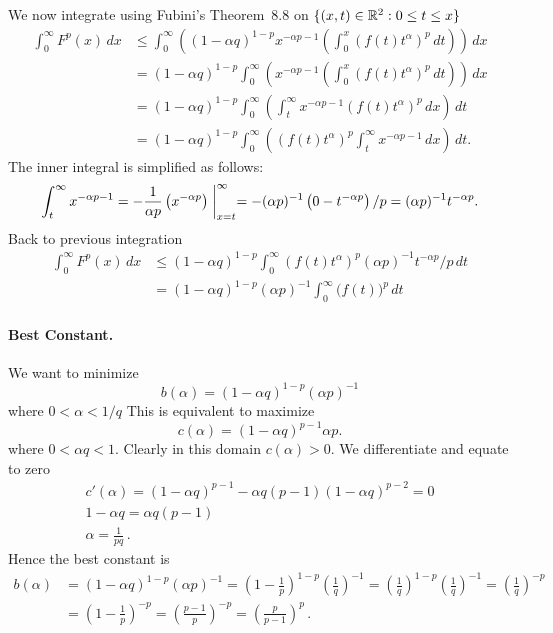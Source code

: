 \begin{enumerate}
We now integrate using 
Fubini's Theorem~8.8 on \(\{(x,t)\in\mathbb{R}^2: 0\leq t \leq x\}\)
\begin{align*}
\int_0^\infty F^p(x)\,dx 
&\leq \int_0^\infty
  \left((1-\alpha q)^{1-p} x^{-\alpha p - 1}
   \left(\int_0^x \left(f(t)t^\alpha\right)^p\,dt\right)\right)\,dx
   \\
&= (1-\alpha q)^{1-p}
   \int_0^\infty
   \left( x^{-\alpha p - 1}
   \left(\int_0^x \left(f(t)t^\alpha\right)^p\,dt\right)\right)\,dx
   \\
&= (1-\alpha q)^{1-p}
   \int_0^\infty 
     \left(\int_t^\infty x^{-\alpha p - 1}
                 \left(f(t)t^\alpha\right)^p\,dx\right)\,dt
   \\
&= (1-\alpha q)^{1-p}
   \int_0^\infty 
     \left(\left(f(t)t^\alpha\right)^p
       \int_t^\infty x^{-\alpha p - 1}
                 \,dx\right)\,dt.
\end{align*}
The inner integral is simplified as follows:
\begin{equation*}
\int_t^\infty x^{-\alpha p - 1}
= -\frac{1}{\alpha p}\left(x^{-\alpha p}\right)\biggm|_{x=t}^\infty
= -(\alpha p)^{-1}\left(0 - t^{-\alpha p}\right)/p = (\alpha p)^{-1} t^{-\alpha p}.
\end{equation*}
Back to previous integration
\begin{align*}
\int_0^\infty F^p(x)\,dx 
 &\leq (1-\alpha q)^{1-p}
   \int_0^\infty \left(f(t)t^\alpha\right)^p (\alpha p)^{-1} t^{-\alpha p}/p\,dt
 \\
 &= (1-\alpha q)^{1-p} (\alpha p)^{-1} \int_0^\infty \bigl(f(t)\bigr)^p\,dt
\end{align*}

\paragraph{Best Constant.}
We want to minimize
\begin{equation*}
b(\alpha) = (1-\alpha q)^{1-p} (\alpha p)^{-1}
\end{equation*}
where \(0 < \alpha < 1/q\)
This is equivalent to maximize  
\begin{equation*}
c(\alpha) = (1-\alpha q)^{p-1} \alpha p.
\end{equation*}
where \(0 < \alpha q < 1\).
Clearly in this domain \(c(\alpha) > 0\). We differentiate and equate to zero
\begin{gather*}
c'(\alpha) =  (1 - \alpha q)^{p-1} - \alpha q (p-1)(1 - \alpha q)^{p-2} = 0 \\
1 - \alpha q = \alpha q(p-1) \\
\alpha = \frac{1}{pq}\,.
\end{gather*}
Hence the best constant is
\begin{align*}
b(\alpha) 
&= (1-\alpha q)^{1-p} (\alpha p)^{-1}
= \left(1-\frac{1}{p}\right)^{1-p} \left(\frac{1}{q}\right)^{-1}
= \left(\frac{1}{q}\right)^{1-p} \left(\frac{1}{q}\right)^{-1}
= \left(\frac{1}{q}\right)^{-p}
\\
&= \left(1-\frac{1}{p}\right)^{-p}
= \left(\frac{p-1}{p}\right)^{-p}
= \left(\frac{p}{p-1}\right)^{p}\,.
\end{align*}


\end{enumerate}
